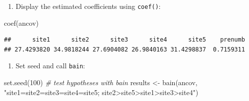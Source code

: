 \documentclass[
]{book}
\newenvironment{Shaded}{\begin{snugshade}}{\end{snugshade}}
\newcommand{\CommentTok}[1]{\textcolor[rgb]{0.56,0.35,0.01}{\textit{#1}}}
\newcommand{\DecValTok}[1]{\textcolor[rgb]{0.00,0.00,0.81}{#1}}
\newcommand{\FunctionTok}[1]{\textcolor[rgb]{0.00,0.00,0.00}{#1}}
\newcommand{\NormalTok}[1]{#1}
\newcommand{\OtherTok}[1]{\textcolor[rgb]{0.56,0.35,0.01}{#1}}
\newcommand{\SpecialCharTok}[1]{\textcolor[rgb]{0.00,0.00,0.00}{#1}}
\newcommand{\StringTok}[1]{\textcolor[rgb]{0.31,0.60,0.02}{#1}}
\providecommand{\tightlist}{%
  \setlength{\itemsep}{0pt}\setlength{\parskip}{0pt}}
\begin{document}
\begin{Shaded}
\end{Shaded}

\begin{enumerate}
\def\labelenumi{\arabic{enumi})}
\setcounter{enumi}{1}
\tightlist
\item
  Display the estimated coefficients using \texttt{coef()}:
\end{enumerate}

\begin{Shaded}
\begin{Highlighting}[]
\FunctionTok{coef}\NormalTok{(ancov)}
\end{Highlighting}
\end{Shaded}

\begin{verbatim}
##      site1      site2      site3      site4      site5    prenumb 
## 27.4293820 34.9818244 27.6904082 26.9840163 31.4298837  0.7159311
\end{verbatim}

\begin{enumerate}
\def\labelenumi{\arabic{enumi})}
\setcounter{enumi}{2}
\tightlist
\item
  Set seed and call \texttt{bain}:
\end{enumerate}

\begin{Shaded}
\begin{Highlighting}[]
\FunctionTok{set.seed}\NormalTok{(}\DecValTok{100}\NormalTok{)}
\CommentTok{\# test hypotheses with bain}
\NormalTok{results }\OtherTok{\textless{}{-}} \FunctionTok{bain}\NormalTok{(ancov, }\StringTok{"site1=site2=site3=site4=site5;}
\StringTok{                        site2\textgreater{}site5\textgreater{}site1\textgreater{}site3\textgreater{}site4"}\NormalTok{)}
\end{Highlighting}
\end{Shaded}
\end{document}
